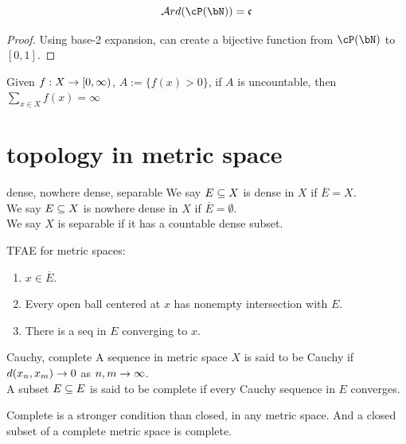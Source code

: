 \documentclass[lang=cn,11pt]{elegantbook}
\begin{document}
\begin{proposition}
    \begin{equation}
        \mathcal{A}rd(\cP(\bN)) = \mathfrak{c}
    \end{equation}
\end{proposition}
\begin{proof}
    Using base-2 expansion, can create a bijective function from $\cP(\bN)$ to $[0,1]$.
\end{proof}


\begin{proposition}
    Given $f: X \rightarrow [0,\infty)$, $A:= \{ f(x)>0 \}$, if $A$ is uncountable, then $\sum_{x \in X}f(x) = \infty$
\end{proposition}


\section{topology in metric space}
\begin{definition}{dense, nowhere dense, separable}
We say $E \subseteq X$ is dense in $X$ if $\overline{E} = X$.\\
We say $E \subseteq X$ is nowhere dense in $X$ if 
$\overline{E} = \emptyset $.\\
We say $X$ is separable if it has a countable dense subset.
\end{definition}


\begin{proposition}
    TFAE for metric spaces:
    \begin{enumerate}
        \item $x \in \overline{E}$.
        \item Every open ball centered at $x$ has nonempty intersection with $E$.
        \item There is a seq in $E$ converging to $x$.
    \end{enumerate}
\end{proposition}


\begin{definition}{Cauchy, complete}
    A sequence in metric space $X$ is said to be Cauchy if $d(x_n,x_m) \rightarrow 0$ as $n,m \rightarrow \infty$.\\
    A subset $E\subseteq E$ is said to be complete if every Cauchy sequence in $E$ converges.
\end{definition}

\begin{proposition}
    Complete is a stronger condition than closed, in any metric space. And a closed subset of a complete metric space is complete.
\end{proposition}
\end{document}
